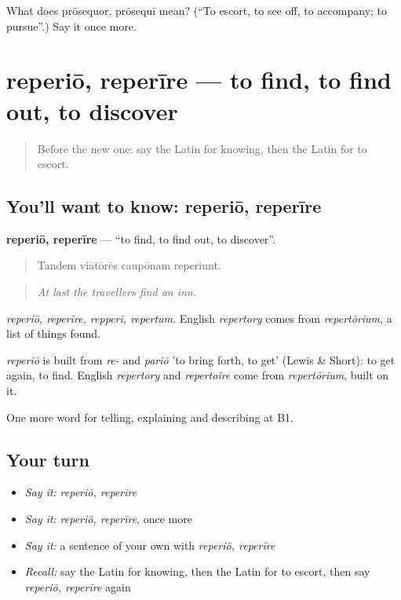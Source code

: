 \begin{tcolorbox}[breakable,colback=teal!4,colframe=teal!35!black,title={Before you move on}]
What does prōsequor, prōsequī mean? (\textquotedblleft{}To escort, to see off, to accompany; to pursue\textquotedblright{}.) Say it once more.
\end{tcolorbox}
\section[reperiō, reperīre]{reperiō, reperīre — to find, to find out, to discover}

\label{lesson:LA-C453-reperio}



\begin{quote}
Before the new one: say the Latin for knowing, then the Latin for to escort.
\end{quote}

\subsection*{You'll want to know: reperiō, reperīre}
\textbf{reperiō, reperīre} — \textquotedblleft{}to find, to find out, to discover\textquotedblright{}.

\begin{quote}
Tandem viātōrēs caupōnam reperiunt.
\end{quote}

\begin{quote}
\emph{At last the travellers find an inn.}
\end{quote}

\emph{reperiō, reperīre, repperī, repertum}. English \emph{repertory} comes from \emph{repertōrium}, a list of things found.

\begin{cousinweb}
\emph{reperiō} is built from \emph{re-} and \emph{pariō} 'to bring forth, to get' (Lewis \& Short): to get again, to find. English \emph{repertory} and \emph{repertoire} come from \emph{repertōrium}, built on it.
\end{cousinweb}

\begin{grammarlens}[title={What you've built}]
One more word for telling, explaining and describing at B1.
\end{grammarlens}

\subsection*{Your turn}
\begin{itemize}
\raggedright
  \item \emph{Say it:} \emph{reperiō, reperīre}
  \item \emph{Say it:} \emph{reperiō, reperīre}, once more
  \item \emph{Say it:} a sentence of your own with \emph{reperiō, reperīre}
  \item \emph{Recall:} say the Latin for knowing, then the Latin for to escort, then say \emph{reperiō, reperīre} again
\end{itemize}

